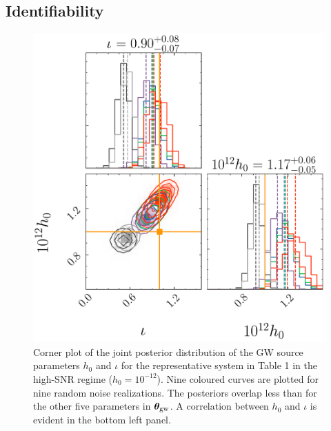 \documentclass[fleqn,usenatbib,useAMS]{mnras}
\begin{document}
\subsection{Identifiability}\label{sec:identif}
\begin{figure}
	\centering
	\includegraphics[width=\columnwidth]{images/stacked_GW_plot_iota_h}
	\caption{Corner plot of the joint posterior distribution of the GW source parameters $h_0$ and $\iota$ for the representative system in Table 1 in the high-SNR regime ($h_0 = 10^{-12}$). Nine coloured curves are plotted for nine random noise realizations. The posteriors overlap less than for the other five parameters in ${\boldsymbol{\theta}}_{\rm gw}$. A correlation between $h_0$ and $\iota$ is evident in the bottom left panel.}
	\label{fig:just_iota_h}
\end{figure}
\end{document}
